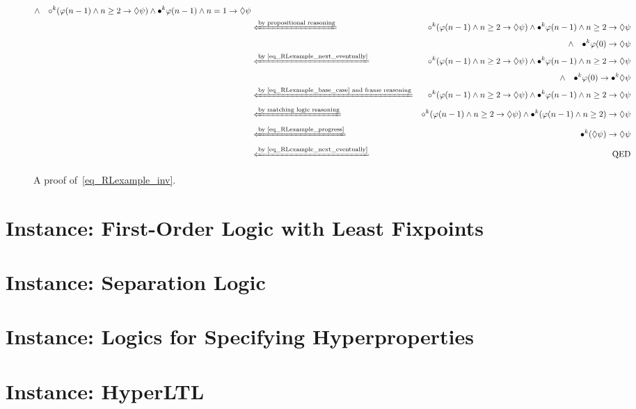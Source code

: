 \documentclass{amsart}
\begin{document}
\begin{figure}[h]
{\begin{align*}
		\wedge\quad
		{\circ}^k  (\varphi(n-1) \wedge n \ge 2 \to {\lozenge} \psi)
		\wedge {\bullet}^k \varphi(n-1) \wedge n = 1 \to {\lozenge} \psi
		\\
		&\xLeftarrow{\text{by propositional reasoning}}&
		{\circ}^k  (\varphi(n-1) \wedge n \ge 2 \to {\lozenge} \psi)
		\wedge {\bullet}^k \varphi(n-1) \wedge n \ge 2 \to {\lozenge} \psi
		\\&&
		\wedge\quad
		{\bullet}^k \varphi(0) \to {\lozenge} \psi
		\\
		&\xLeftarrow{\text{by~\eqref{eq_RLexample_next_eventually}}}&
		{\circ}^k  (\varphi(n-1) \wedge n \ge 2 \to {\lozenge} \psi)
		\wedge {\bullet}^k \varphi(n-1) \wedge n \ge 2 \to {\lozenge} \psi
		\\&&
		\wedge\quad
		{\bullet}^k \varphi(0) \to {\bullet}^k {\lozenge} \psi
		\\
		&\xLeftarrow{\text{by~\eqref{eq_RLexample_base_case} and frame reasoning}}&
		{\circ}^k  (\varphi(n-1) \wedge n \ge 2 \to {\lozenge} \psi)
		\wedge {\bullet}^k \varphi(n-1) \wedge n \ge 2 \to {\lozenge} \psi
		\\
		&\xLeftarrow{\text{by matching logic reasoning}}&
		{\circ}^k  (\varphi(n-1) \wedge n \ge 2 \to {\lozenge} \psi)
		\wedge {\bullet}^k (\varphi(n-1) \wedge n \ge 2) \to {\lozenge} \psi
		\\
		&\xLeftarrow{\text{by~\eqref{eq_RLexample_progress}}}&
		{\bullet}^k  ({\lozenge} \psi) \to {\lozenge} \psi
		\\
		&\xLeftarrow{\text{by~\eqref{eq_RLexample_next_eventually}}}&
		\text{QED}
		\end{align*}
	}
	\caption{A proof of~\eqref{eq_RLexample_inv}.}
	\label{fig_RLexample_proof}
\end{figure}

\section{Instance: First-Order Logic with Least Fixpoints}

\newpage
\section{Instance: Separation Logic}


\section{Instance: Logics for Specifying Hyperproperties}


\newpage

\section{Instance: HyperLTL}
\end{document}
